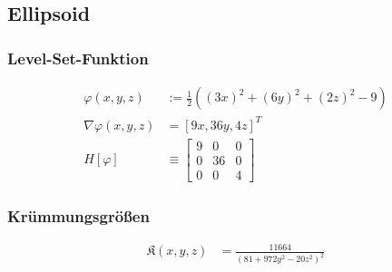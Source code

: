   \subsection{Ellipsoid}
    \label{heineC}
    
    \subsubsection{Level-Set-Funktion}
      \begin{align}
        \varphi(x,y,z) &:= \frac{1}{2}\left( (3x)^{2} + (6y)^{2} + (2z)^{2} - 9 \right) \\
        \nabla\varphi(x,y,z) &= \left[ 9x, 36y, 4z \right]^{T} \\
        H[\varphi] &\equiv \begin{bmatrix} 9 & 0 & 0 \\
                                             0 & 36 & 0 \\
                                             0 & 0 & 4 \end{bmatrix}
      \end{align}

     \subsubsection{Krümmungsgrößen}
      \begin{align}
        \mathfrak{K}(x,y,z) &= \frac{11664}{(81+972y^{2}-20z^{2})^{2}}
      \end{align}
